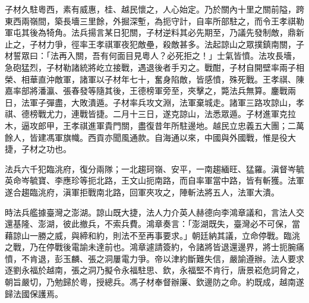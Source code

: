 \begin{pinyinscope}
子材久駐粵西，素有威惠，桂、越民懷之，人心始定。乃於關內十里之關前隘，跨東西兩嶺間，築長墻三里餘，外掘深塹，為扼守計，自率所部駐之，而令王孝祺勒軍屯其後為犄角。法兵揚言某日犯關，子材逆料其必先期至，乃議先發制敵，鼎新止之，子材力爭，徑率王孝祺軍夜犯敵壘，殺敵甚多。法起諒山之眾撲鎮南關，子材誓眾曰：「法再入關，吾有何面目見粵人？必死拒之！」士氣皆憤。法攻長墻，急砲猛烈，子材勒諸統將屹立接戰，遇退後者手刃之。戰酣，子材自開壁率兩子相榮、相華直沖敵軍，諸軍以子材年七十，奮身陷敵，皆感憤，殊死戰。王孝祺、陳嘉率部將潘瀛、張春發等隨其後，王德榜軍旁至，夾擊之，斃法兵無算。鏖戰兩日，法軍子彈盡，大敗潰遁。子材率兵攻文淵，法軍棄城走。諸軍三路攻諒山，孝祺、德榜戰尤力，連戰皆捷。二月十三日，遂克諒山，法悉眾遁。子材進軍克拉木，逼攻郎甲，王孝祺進軍貴門關，盡復昔年所駐邊地。越民立忠義五大團；二萬餘人，皆建馮軍旗幟。西貢亦聞風通款。自海通以來，中國與外國戰，惟是役大捷，子材之功也。

法兵六千犯臨洮府，復分兩隊；一北趨珂嶺、安平，一南趨緬旺、猛羅。滇督岑毓英命岑毓寶、李應珍等扼北路，王文山扼南路，而自率軍當中路，皆有斬獲。法軍遂合趨臨洮府，滇軍拒戰南北路，回軍夾攻之，陣斬法將五人，法軍大潰。

時法兵艦據臺灣之澎湖。諒山既大捷，法人力介英人赫德向李鴻章議和，言法人交還基隆、澎湖，彼此撤兵，不索兵費。鴻章奏言：「澎湖既失，臺灣必不可保，當藉諒山一勝之威，與締和約，則法不至再事要求。」朝廷納其議，立命停戰。臨洮之戰，乃在停戰後電諭未達前也。鴻章遽請簽約，令諸將皆退還邊界，將士扼腕痛憤，不肯退，彭玉麟、張之洞屢電力爭。帝以津約斷難失信，嚴諭遵辦。法人要求逐劉永福於越南，張之洞乃擬令永福駐思、欽，永福堅不肯行，唐景崧危詞脅之，朝旨嚴切，乃勉歸於粵，授總兵。馮子材奉督辦廉、欽邊防之命。約既成，越南遂歸法國保護焉。


\end{pinyinscope}